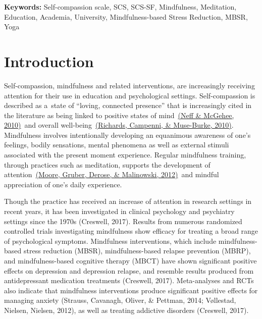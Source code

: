 \documentclass[10pt]{article}
\begin{document}
\colorbox{gray!10}{%
        \begin{minipage}{1\linewidth}%
            \vspace*{2pt}%
\textbf{Keywords:} Self-compassion scale, SCS, SCS-SF, Mindfulness, Meditation, Education, Academia, University, Mindfulness-based Stress Reduction, MBSR, Yoga
            \vspace*{2pt}%
        \end{minipage}%
        }


\section*{Introduction}

{\label{874460}}

Self-compassion, mindfulness and related interventions, are increasingly
receiving attention for their use in education and psychological
settings. Self-compassion is described as a~state of ``loving, connected
presence'' that is increasingly cited in the literature as being linked
to positive states of mind~\hyperref[csl:5]{(Neff \& McGehee, 2010)}~and overall
well-being~\hyperref[csl:6]{(Richards, Campenni, \& Muse-Burke, 2010)}. Mindfulness involves intentionally
developing an equanimous awareness of one's feelings, bodily sensations,
mental phenomena as well as external stimuli associated with the present
moment experience. Regular mindfulness training, through practices such
as meditation, supports the development of
attention~\hyperref[csl:7]{(Moore, Gruber, Derose, \& Malinowski, 2012)}~and mindful appreciation of one's daily
experience.~

Though the practice has received an increase of attention in research
settings in recent years, it has been investigated in clinical
psychology and psychiatry settings since the 1970s (Creswell, 2017).
Results from numerous randomized controlled trials investigating
mindfulness show efficacy for treating a broad range of psychological
symptoms. Mindfulness interventions, which include mindfulness-based
stress reduction (MBSR), mindfulness-based relapse prevention (MBRP),
and mindfulness-based cognitive therapy (MBCT) have shown significant
positive effects on depression and depression relapse, and resemble
results produced from antidepressant medication treatments (Creswell,
2017). Meta-analyses and RCTs also indicate that mindfulness
interventions produce significant positive effects for managing anxiety
(Strauss, Cavanagh, Oliver, \& Pettman, 2014; Vøllestad, Nielsen,
Nielsen, 2012), as well as treating addictive disorders (Creswell,
2017).
\end{document}
